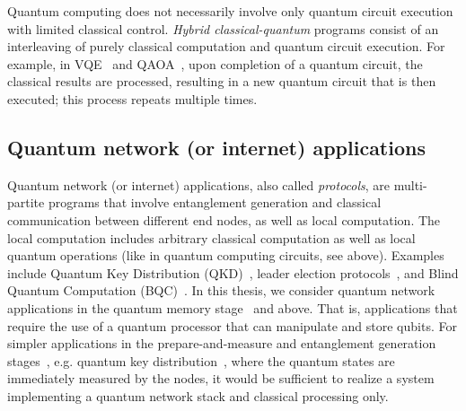 Quantum computing does not necessarily involve only quantum circuit execution with limited classical control.
\emph{Hybrid classical-quantum} programs consist of an interleaving of purely classical computation and quantum circuit execution.
For example, in \acf{VQE}~\cite{diadamo2021distributed, liu2022layer} and \acf{QAOA}~\cite{farhi2014quantum},
upon completion of a quantum circuit, the classical results are processed, resulting in a new quantum circuit that is then executed; this process repeats multiple times.

\subsection{Quantum network (or internet) applications}
Quantum network (or internet) applications, also called \textit{protocols}, are multi-partite programs that involve entanglement generation and classical communication between different end nodes, as well as local computation.
The local computation includes arbitrary classical computation as well as local quantum operations (like in quantum computing circuits, see above).
Examples include Quantum Key Distribution (QKD)~\cite{bb84, ekert_1991_e91}, leader election protocols~\cite{kobayashi2014simpler, ganz2009quantum}, and Blind Quantum Computation (BQC)~\cite{Wehner2018stages}.
In this thesis, we consider quantum network applications in the quantum memory stage~\cite{wehner_2018_stages} and above. That is, applications that require the use of a quantum processor that can manipulate and store qubits. For simpler applications in the prepare-and-measure and entanglement generation stages~\cite{wehner_2018_stages}, e.g. quantum key distribution~\cite{bb84Original,ekert_1991_e91}, where the quantum states are immediately measured by the nodes, it would be sufficient to realize a system implementing a quantum network stack and classical processing only.

